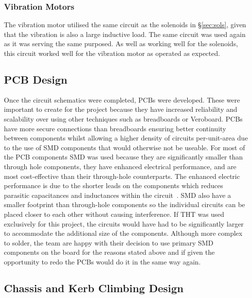 \documentclass [12pt]{article}
\begin{document}
\subsubsection{Vibration Motors}
The vibration motor utilised the same circuit as the solenoids in §\ref{sec:sols}, given that the vibration is also a large inductive load. The same circuit was used again as it was serving the same purposed.  As well as working well for the solenoids, this circuit worked well for the vibration motor as operated as expected.

\subsection{PCB Design}

Once the circuit schematics were completed, PCBs were developed. These were important to create for the project because they have increased reliability and scalability over using other techniques such as breadboards or Veroboard. PCBs have more secure connections than breadboards ensuring better continuity between components whilst allowing a higher density of circuits per-unit-area due to the use of SMD components that would otherwise not be useable. For most of the PCB components SMD was used because they are significantly smaller than through hole components, they have enhanced electrical performance, and are most cost-effective than their through-hole counterparts. The enhanced electric performance is due to the shorter leads on the components which reduces parasitic capacitances and inductances within the circuit~\cite{springer-chapter-pcb}.  SMD also have a smaller footprint than through-hole components so the individual circuits can be placed closer to each other without causing interference. If THT was used exclusively for this project, the circuits would have had to be significantly larger to accommodate the additional size of the components.
Although more complex to solder, the team are happy with their decision to use primary SMD components on the board for the reasons stated above and if given the opportunity to redo the PCBs would do it in the same way again.

\subsection{Chassis and Kerb Climbing Design}
\end{document}
